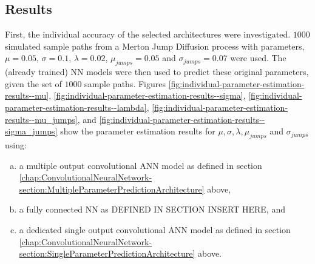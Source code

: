 \documentclass[11pt,oneside,openany,a4paper,english, report, goldenblock
]{usthesis}
\begin{document}
\subsection{Results}

First, the individual accuracy of the selected architectures were investigated. $1000$ simulated sample paths from a Merton Jump Diffusion process with parameters, $\mu = 0.05$, $\sigma = 0.1$, $\lambda = 0.02$, $\mu_{jumps} = 0.05$ and $\sigma_{jumps} = 0.07$ were used. The (already trained) NN models were then used to predict these original parameters, given the set of $1000$ sample paths. Figures \ref{fig:individual-parameter-estimation-results--mu}, \ref{fig:individual-parameter-estimation-results--sigma}, \ref{fig:individual-parameter-estimation-results--lambda}, \ref{fig:individual-parameter-estimation-results--mu_jumps}, and \ref{fig:individual-parameter-estimation-results--sigma_jumps} show the parameter estimation results for $\mu, \sigma, \lambda, \mu_{jumps}$ and $\sigma_{jumps}$ using: 

\begin{enumerate}[a)]
	\itemsep0em 
	\item  a multiple output convolutional ANN model as defined in section \ref{chap:ConvolutionalNeuralNetwork-section:MultipleParameterPredictionArchitecture} above,
	\item  a fully connected NN as DEFINED IN SECTION INSERT HERE, and
	\item  a dedicated single output convolutional ANN model as defined in section \ref{chap:ConvolutionalNeuralNetwork-section:SingleParameterPredictionArchitecture} above.
\end{enumerate}
\end{document}
